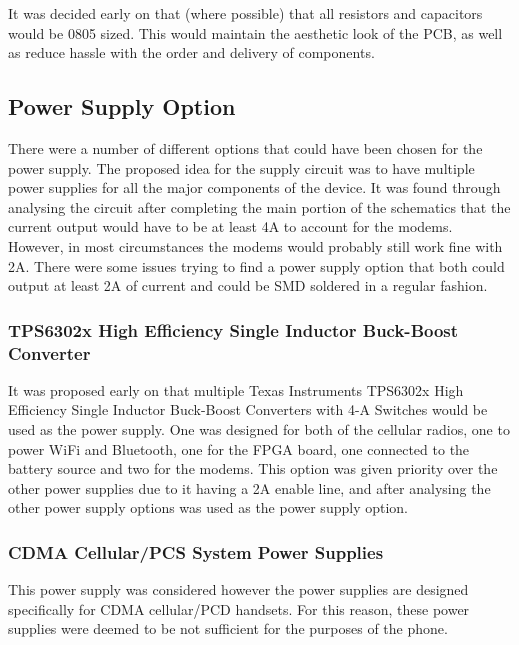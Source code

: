It was decided early on that (where possible) that all resistors and capacitors would be 0805 sized. This would maintain the aesthetic look of the PCB, as well as reduce hassle with the order and delivery of components. 


\subsection{Power Supply Option}

	There were a number of different options that could have been chosen for the power supply. The proposed idea for the supply circuit was to have multiple power supplies for all the major components of the device. It was found through analysing the circuit after completing the main portion of the schematics that the current output would have to be at least 4A to account for the modems. However, in most circumstances the modems would probably still work fine with 2A. There were some issues trying to find a power supply option that both could output at least 2A of current and could be SMD soldered in a regular fashion. 

\subsubsection{TPS6302x High Efficiency Single Inductor Buck-Boost Converter}

It was proposed early on that multiple Texas Instruments TPS6302x High Efficiency Single Inductor Buck-Boost Converters with 4-A Switches would be used as the power supply. One was designed for both of the cellular radios, one to power WiFi and Bluetooth, one for the FPGA board, one connected to the battery source and two for the modems. 
This option was given priority over the other power supplies due to it having a 2A enable line, and after analysing the other power supply options was used as the power supply option. 


\subsubsection{CDMA Cellular/PCS System Power Supplies}

This power supply was considered however the power supplies are designed specifically for CDMA cellular/PCD handsets. For this reason, these power supplies were deemed to be not sufficient for the purposes of the phone. 

